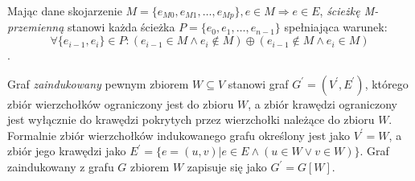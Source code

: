 \begin{definition}
  Mając dane skojarzenie ${M=\{e_{M0}, e_{M1}, \ldots, e_{Mp}\}, e \in M \Rightarrow e \in E}$,
  \emph{ścieżkę M-przemienną} stanowi każda ścieżka $P=\{e_0, e_1, \ldots, e_{n-1}\}$ spełniająca warunek: 
  \[{\forall{\{e_{i-1}, e_i\} \in P}: (e_{i-1} \in M \land e_{i} \notin M) \oplus
  (e_{i-1} \notin M \land e_{i} \in M)}\].
\end{definition}

\begin{definition}
  Graf \emph{zaindukowany} pewnym zbiorem $W \subseteq V$ stanowi graf $G^\prime=(V^\prime, E^\prime)$, którego zbiór wierzchołków ograniczony jest do zbioru $W$, a zbiór krawędzi ograniczony jest wyłącznie do krawędzi pokrytych przez wierzchołki należące do zbioru $W$.
  Formalnie zbiór wierzchołków indukowanego grafu określony jest jako $V^\prime = W$, a zbiór jego krawędzi jako $E^\prime=\{e=(u,v)|e\in E \land (u \in W \lor v \in W)\}$.
  Graf zaindukowany z grafu $G$ zbiorem $W$ zapisuje się jako $G^\prime = G[W]$.
\end{definition}
